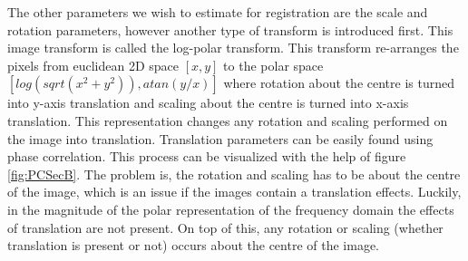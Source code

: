 The other parameters we wish to estimate for registration are the scale and rotation parameters, however another type of transform is introduced first. This image transform is called the log-polar transform. This transform re-arranges the pixels from euclidean 2D space $[x,y]$ to the polar space $[log(sqrt(x^2+y^2)),atan(y/x)]$ where rotation about the centre is turned into y-axis translation and scaling about the centre is turned into x-axis translation. This representation changes any rotation and scaling performed on the image into translation. Translation parameters can be easily found using phase correlation. This process can be visualized with the help of figure \ref{fig:PCSecB}. The problem is, the rotation and scaling has to be about the centre of the image, which is an issue if the images contain a translation effects. Luckily, in the magnitude of the polar representation of the frequency domain the effects of translation are not present. On top of this, any rotation or scaling (whether translation is present or not) occurs about the centre of the image. \\

